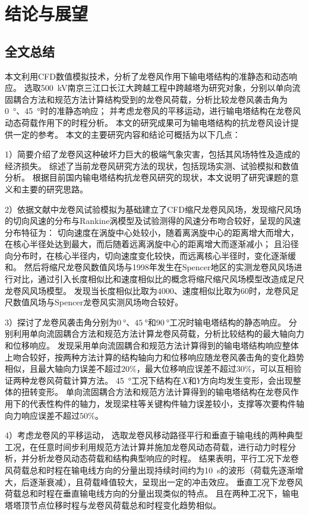 
\chapter{结论与展望}

\section{全文总结}

本文利用CFD数值模拟技术，分析了龙卷风作用下输电塔结构的准静态和动态响应。
选取\SI{500}{kV}南京三江口长江大跨越工程中跨越塔为研究对象，分别以单向流固耦合方法和规范方法计算结构受到的龙卷风荷载，分析比较龙卷风袭击角为\SI{0}{\degree}、\SI{45}{\degree}时的准静态响应；
并考虑龙卷风的平移运动，进行输电塔结构在龙卷风动态荷载作用下的时程分析。
本文的研究成果可为输电塔结构的抗龙卷风设计提供一定的参考。
本文的主要研究内容和结论可概括为以下几点：

1）简要介绍了龙卷风这种破坏力巨大的极端气象灾害，包括其风场特性及造成的经济损失。
综述了当前龙卷风研究方法的现状，包括现场实测、试验模拟和数值分析。
根据目前国内输电塔结构抗龙卷风研究的现状，本文说明了研究课题的意义和主要的研究思路。

2）依据文献中龙卷风试验模拟为基础建立了CFD缩尺龙卷风风场，发现缩尺风场的切向风速的分布与Rankine涡模型及试验测得的风速分布吻合较好，呈现的风速分布特征为：
切向速度在涡旋中心处较小，随着离涡旋中心的距离增大而增大，在核心半径处达到最大，而后随着远离涡旋中心的距离增大而逐渐减小；
且沿径向分布时，在核心半径内，切向速度变化较快，而远离核心半径时，变化逐渐缓和。
然后将缩尺龙卷风数值风场与1998年发生在Spencer地区的实测龙卷风风场进行对比，通过引入长度相似比和速度相似比的概念将缩尺缩尺风场模型改造成足尺龙卷风风场模型。
发现当长度相似比取为$4000$、速度相似比取为$60$时，龙卷风足尺数值风场与Spencer龙卷风实测风场吻合较好。

3）探讨了龙卷风袭击角分别为$\SI{0}{\degree}$、$\SI{45}{\degree}$和$\SI{90}{\degree}$工况时输电塔结构的静态响应。
分别利用单向流固耦合方法和规范方法计算龙卷风荷载，分析比较结构的最大轴向力和位移响应。
发现采用单向流固耦合和规范方法计算得到的输电塔结构响应整体上吻合较好，按两种方法计算的结构轴向力和位移响应随龙卷风袭击角的变化趋势相似，且最大轴向力误差不超过$20\%$，最大位移响应误差不超过$30\%$，可以互相验证两种龙卷风荷载计算方法。
\SI{45}{\degree}工况下结构在$X$和$Y$方向均发生变形，会出现整体的扭转变形。
单向流固耦合方法和规范方法计算得到的输电塔结构在龙卷风作用下的代表性构件的轴力，发现梁柱等关键构件轴力误差较小，支撑等次要构件轴向力响应误差不超过$50\%$。

4）考虑龙卷风的平移运动，  选取龙卷风移动路径平行和垂直于输电线的两种典型工况，在任意时间步利用规范方法计算并施加龙卷风动态荷载，进行动力时程分析，并分析龙卷风动态荷载和结构典型响应的时程。
结果表明，平行工况下龙卷风荷载总和时程在输电线方向的分量出现持续时间约为\SI{10}{s}的波形（荷载先逐渐增大，后逐渐衰减），且荷载峰值较大，呈现出一定的冲击效应。
垂直工况下龙卷风荷载总和时程在垂直输电线方向的分量出现类似的特点。
且在两种工况下，输电塔塔顶节点位移时程与龙卷风荷载总和时程变化趋势相似。


